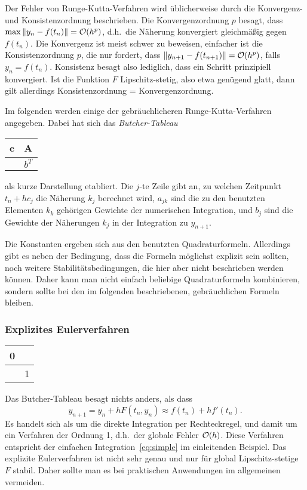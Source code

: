 Der Fehler von Runge-Kutta-Verfahren wird üblicherweise durch die
Konvergenz- und Konsistenzordnung beschrieben. Die Konvergenzordnung
$p$ besagt, dass $\max \left\lVert{y_n - f(t_n)}\right\rVert = \mathcal O(h^p)$, d.h.\ die
Näherung konvergiert gleichmäßig gegen $f(t_n)$. Die Konvergenz ist
meist schwer zu beweisen, einfacher ist die Konsistenzordnung $p$, die
nur fordert, dass $\left\lVert{y_{n+1} - f(t_{n+1})}\right\rVert = \mathcal O(h^p)$, falls
$y_n=f(t_n)$. Konsistenz besagt also lediglich, dass ein Schritt
prinzipiell konvergiert. Ist die Funktion $F$ Lipschitz-stetig, also
etwa genügend glatt, dann gilt allerdings Konsistenzordnung =
Konvergenzordnung.

%
Im folgenden werden einige der gebräuchlicheren Runge-Kutta-Verfahren
angegeben. Dabei hat sich das \emph{Butcher-Tableau}
\begin{center}
  \renewcommand{\arraystretch}{1.3}
  \begin{tabular}{r|l}
    c & A \\\hline
    & $b^T$
  \end{tabular}
\end{center}
als kurze Darstellung etabliert. Die $j$-te Zeile gibt an, zu welchen
Zeitpunkt $t_n + hc_j$ die Näherung $k_j$ berechnet wird, $a_{jk}$
sind die zu den benutzten Elementen $k_k$ gehörigen Gewichte der
numerischen Integration, und $b_j$ sind die Gewichte der
Näherungen $k_j$ in der Integration zu $y_{n+1}$.

Die Konstanten ergeben sich aus den benutzten
Quadraturformeln. Allerdings gibt es neben der Bedingung, dass die
Formeln möglichst explizit sein sollten, noch weitere
Stabilitätsbedingungen, die hier aber nicht beschrieben werden
können. Daher kann man nicht einfach beliebige Quadraturformeln
kombinieren, sondern sollte bei den im folgenden beschriebenen,
gebräuchlichen Formeln bleiben.

\subsubsection{Explizites Eulerverfahren}

\begin{center}
  \renewcommand{\arraystretch}{1.3}
  \begin{tabular}{r|l}
    0 & \\\hline
    & 1
  \end{tabular}
\end{center}

Das Butcher-Tableau besagt nichts anders, als dass
\begin{equation}
  y_{n+1} = y_n + h F(t_n, y_n) \approx f(t_n) + h f'(t_n).
\end{equation}
Es handelt sich als um die direkte Integration per Rechteckregel, und
damit um ein Verfahren der Ordnung 1, d.h.\ der globale Fehler
$\mathcal O(h)$. Diese Verfahren entspricht der einfachen
Integration~\eqref{eq:simple} im einleitenden Beispiel. Das explizite
Eulerverfahren ist nicht sehr genau und nur für global
Lipschitz-stetige $F$ stabil. Daher sollte man es bei praktischen
Anwendungen im allgemeinen vermeiden.

